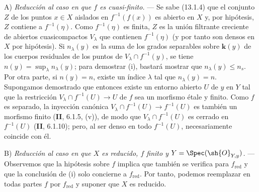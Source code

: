 A) \emph{Reducción al caso en que $f$ es cuasi-finito.} --- Se sabe (13.1.4) que el conjunto $Z$ de los puntos $x\in X$ aislados en $f^{-1}(f(x))$ es abierto en $X$ y, por hipótesis, $Z$ contiene a $f^{-1}(\eta)$. Como $f^{-1}(\eta)$ es finita, $Z$ es la unión filtrante creciente de abiertos cuasicompactos $V_\lambda$ que contienen $f^{-1}(\eta)$ (y por tanto son densos en $X$ por hipótesis). Si $n_\lambda(y)$ es la suma de los grados separables sobre $\boldsymbol k(y)$ de los cuerpos residuales de los puntos de $V_\lambda\cap f^{-1}(y)$, se tiene $n(y)=\sup_\lambda n_\lambda(y)$; para demostrar (i), bastará mostrar que $n_\lambda(y)\leq n_s$. Por otra parte, si $n(y)=n$, existe un índice $\lambda$ tal que $n_\lambda(y)=n$. Supongamos demostrado que entonces existe un entorno abierto $U$ de $y$ en $Y$ tal que la restricción $V_\lambda\cap f^{-1}(U)\to U$ de $f$ sea un morfismo étale y finito. Como $f$ es separado, la inyección canónica $V_\lambda\cap f^{-1}(U)\to f^{-1}(U)$ es también un morfismo finito (\textbf{II}, 6.1.5, (v)), de modo que $V_\lambda\cap f^{-1}(U)$ es cerrado en $f^{-1}(U)$ (\textbf{II}, 6.1.10); pero, al ser denso en todo $f^{-1}(U)$, necesariamente coincide con él.

B) \emph{Reducción al caso en que $X$ es reducido, $f$ finito y $Y=\Spec(\sh{O}_{Y,y})$.} --- Observemos que la hipótesis sobre $f$ implica que también se verifica para $f_{\mathrm{red}}$ y que la conclusión de (i) solo concierne a $f_{\mathrm{red}}$. Por tanto, podemos reemplazar en todas partes $f$ por $f_{\mathrm{red}}$ y suponer que $X$ es reducido.


